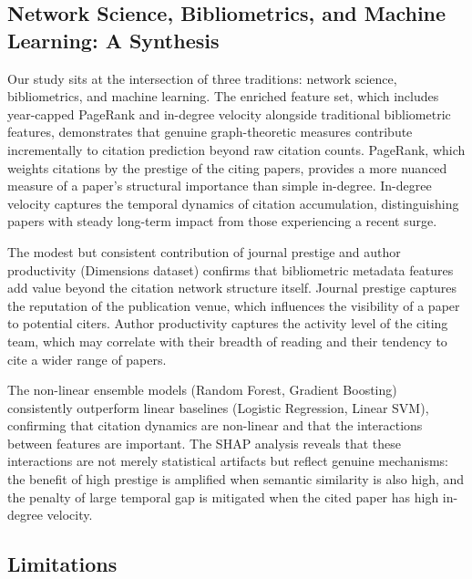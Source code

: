 \documentclass[12pt,a4paper]{article}
\begin{document}
\subsection{Network Science, Bibliometrics, and Machine Learning: A Synthesis}

Our study sits at the intersection of three traditions: network science, bibliometrics,
and machine learning. The enriched feature set, which includes year-capped PageRank
and in-degree velocity alongside traditional bibliometric features, demonstrates
that genuine graph-theoretic measures contribute incrementally to citation prediction
beyond raw citation counts. PageRank, which weights citations by the prestige of
the citing papers, provides a more nuanced measure of a paper's structural importance
than simple in-degree. In-degree velocity captures the temporal dynamics of citation
accumulation, distinguishing papers with steady long-term impact from those
experiencing a recent surge.

The modest but consistent contribution of journal prestige and author productivity
(Dimensions dataset) confirms that bibliometric metadata features add value beyond
the citation network structure itself. Journal prestige captures the reputation of
the publication venue, which influences the visibility of a paper to potential
citers. Author productivity captures the activity level of the citing team, which
may correlate with their breadth of reading and their tendency to cite a wider
range of papers.

The non-linear ensemble models (Random Forest, Gradient Boosting) consistently
outperform linear baselines (Logistic Regression, Linear SVM), confirming that
citation dynamics are non-linear and that the interactions between features are
important. The SHAP analysis reveals that these interactions are not merely
statistical artifacts but reflect genuine mechanisms: the benefit of high prestige
is amplified when semantic similarity is also high, and the penalty of large
temporal gap is mitigated when the cited paper has high in-degree velocity.

\subsection{Limitations}
\end{document}
